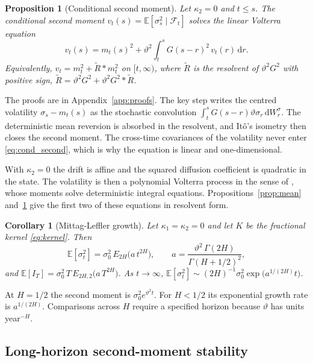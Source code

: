 \documentclass{rQUF2e}
\theoremstyle{plain}
\newtheorem{proposition}[theorem]{Proposition}
\newtheorem{corollary}[theorem]{Corollary}
\theoremstyle{definition}
\theoremstyle{remark}
\newcommand{\D}{\mathrm{d}}
\newcommand{\E}{\mathbb{E}}
\newcommand{\F}{\mathcal{F}}
\begin{document}
\begin{proposition}[Conditional second moment]\label{prop:second}
Let $\kappa_2=0$ and $t\le s$. The conditional second moment $v_t(s)=\E[\sigma_s^2\mid\F_t]$ solves the linear Volterra equation
\begin{equation}\label{eq:cond_second}
v_t(s)=m_t(s)^2+\vartheta^2\int_t^sG(s-r)^2\,v_t(r)\,\D r .
\end{equation}
Equivalently, $v_t=m_t^2+\widetilde R*m_t^2$ on $[t,\infty)$, where $\widetilde R$ is the resolvent of $\vartheta^2G^2$ with positive sign, $\widetilde R=\vartheta^2G^2+\vartheta^2G^2*\widetilde R$.
\end{proposition}

The proofs are in Appendix~\ref{app:proofs}. The key step writes the centred volatility $\sigma_s-m_t(s)$ as the stochastic convolution $\int_t^sG(s-r)\vartheta\sigma_r\,\D W^\sigma_r$. The deterministic mean reversion is absorbed in the resolvent, and It\^o's isometry then closes the second moment. The cross-time covariances of the volatility never enter \eqref{eq:cond_second}, which is why the equation is linear and one-dimensional.

With $\kappa_2=0$ the drift is affine and the squared diffusion coefficient is quadratic in the state. The volatility is then a polynomial Volterra process in the sense of \citet{AbiJaberCuchieroPelizzariPulidoSvalutoFerro2024}, whose moments solve deterministic integral equations. Propositions~\ref{prop:mean} and~\ref{prop:second} give the first two of these equations in resolvent form.

\begin{corollary}[Mittag-Leffler growth]\label{cor:ml}
Let $\kappa_1=\kappa_2=0$ and let $K$ be the fractional kernel \eqref{eq:kernel}. Then
\begin{equation}\label{eq:ml_second}
\E[\sigma_t^2]=\sigma_0^2\,E_{2H}\big(a\,t^{2H}\big),\qquad a=\frac{\vartheta^2\,\Gamma(2H)}{\Gamma(H+1/2)^2},
\end{equation}
and $\E[I_T]=\sigma_0^2\,T\,E_{2H,2}\big(a\,T^{2H}\big)$. As $t\to\infty$, $\E[\sigma_t^2]\sim(2H)^{-1}\sigma_0^2\exp\big(a^{1/(2H)}t\big)$.
\end{corollary}

At $H=1/2$ the second moment is $\sigma_0^2e^{\vartheta^2t}$. For $H<1/2$ its exponential growth rate is $a^{1/(2H)}$. Comparisons across $H$ require a specified horizon because $\vartheta$ has units year$^{-H}$.
\subsection{Long-horizon second-moment stability}\label{sec:stability}
\end{document}
